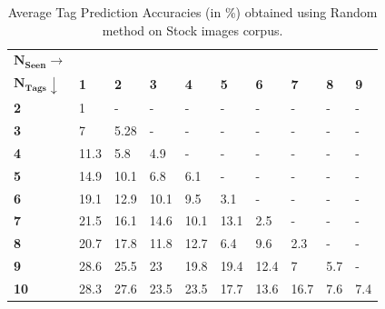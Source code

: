 \begin{table}[!htbp]
\fontsize{8pt}{1em}\selectfont
\begin{center}
\caption{Average Tag Prediction Accuracies (in \%) obtained using Random method on Stock images corpus.}
\label{tab:TPGWS30Random}
\begin{tabular}{|p{1.5cm}|p{0.5cm}|p{0.5cm}|p{0.5cm}|p{0.5cm}|p{0.5cm}|p{0.5cm}|p{0.5cm}|p{0.5cm}|p{0.5cm}|}
		\hline
		{$\boldsymbol{N_{Seen} \rightarrow}$} & &  &  &  & &  &  &  &\\ 
		{$\boldsymbol{N_{Tags}} \downarrow $} & \textbf{1} & \textbf{2} & \textbf{3} & \textbf{4} & \textbf{5}  & \textbf{6} & \textbf{7} & \textbf{8} & \textbf{9} \\ 
		\hline 		
		\textbf{2} & 1&-&-&-&-&-&-&-&- \\
		\hline
		\textbf{3} & 7&5.28&-&-&-&-&-&-&- \\
		\hline
		\textbf{4} & 11.3&5.8&4.9&-&-&-&-&-&-\\
		\hline
		\textbf{5} & 14.9&10.1&6.8&6.1&-&-&-&-&- \\
		\hline
		\textbf{6} & 19.1&12.9&10.1&9.5&3.1&-&-&-&- \\
		\hline
		\textbf{7} & 21.5&16.1&14.6&10.1&13.1&2.5&-&-&- \\ 
		\hline
		\textbf{8} & 20.7&17.8&11.8&12.7&6.4&9.6&2.3&-&- \\
		\hline
		\textbf{9} & 28.6&25.5&23&19.8&19.4&12.4&7&5.7&- \\ 
		\hline
		\textbf{10} & 28.3&27.6&23.5&23.5&17.7&13.6&16.7&7.6&7.4 \\ 
		\hline
\end{tabular}
\vspace{-2.5mm}
\end{center}
\end{table}
